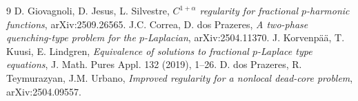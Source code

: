 \documentclass[11pt]{amsart}
\theoremstyle{plain}
\theoremstyle{definition}
\theoremstyle{remark}
\begin{document}
\begin{thebibliography}{9}
 D. Giovagnoli, D. Jesus, L. Silvestre, \emph{$C^{1+\alpha}$
regularity for fractional $p$-harmonic functions}, arXiv:2509.26565.
 J.C. Correa, D. dos Prazeres, \emph{A two-phase quenching-type
problem for the $p$-Laplacian}, arXiv:2504.11370.
 J. Korvenp\"a\"a, T. Kuusi, E. Lindgren, \emph{Equivalence of
solutions to fractional $p$-Laplace type equations}, J. Math. Pures Appl.
132 (2019), 1--26.
 D. dos Prazeres, R. Teymurazyan, J.M. Urbano, \emph{Improved
regularity for a nonlocal dead-core problem}, arXiv:2504.09557.
\end{thebibliography}
\end{document}
